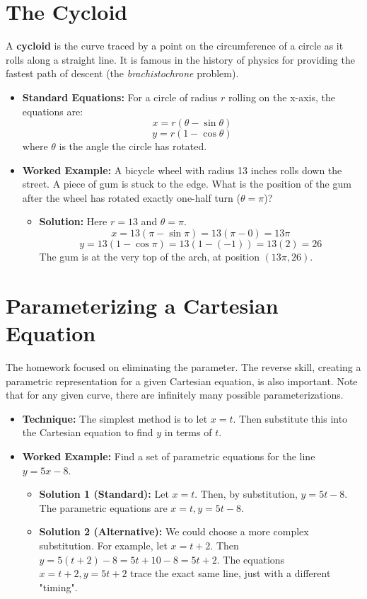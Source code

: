 \documentclass{article}
\begin{document}
\section{The Cycloid}

A \textbf{cycloid} is the curve traced by a point on the circumference of a circle as it rolls along a straight line. It is famous in the history of physics for providing the fastest path of descent (the \textit{brachistochrone} problem).
\begin{itemize}
    \item \textbf{Standard Equations:} For a circle of radius $r$ rolling on the x-axis, the equations are:
    \[ x = r(\theta - \sin \theta) \]
    \[ y = r(1 - \cos \theta) \]
    where $\theta$ is the angle the circle has rotated.

    \item \textbf{Worked Example:} A bicycle wheel with radius 13 inches rolls down the street. A piece of gum is stuck to the edge. What is the position of the gum after the wheel has rotated exactly one-half turn ($\theta = \pi$)?
        \begin{itemize}
            \item \textbf{Solution:} Here $r=13$ and $\theta = \pi$.
            \[ x = 13(\pi - \sin \pi) = 13(\pi - 0) = 13\pi \]
            \[ y = 13(1 - \cos \pi) = 13(1 - (-1)) = 13(2) = 26 \]
            The gum is at the very top of the arch, at position $(13\pi, 26)$.
        \end{itemize}
\end{itemize}

\section{Parameterizing a Cartesian Equation}

The homework focused on eliminating the parameter. The reverse skill, creating a parametric representation for a given Cartesian equation, is also important. Note that for any given curve, there are infinitely many possible parameterizations.
\begin{itemize}
    \item \textbf{Technique:} The simplest method is to let $x=t$. Then substitute this into the Cartesian equation to find $y$ in terms of $t$.

    \item \textbf{Worked Example:} Find a set of parametric equations for the line $y = 5x - 8$.
        \begin{itemize}
            \item \textbf{Solution 1 (Standard):} Let $x=t$. Then, by substitution, $y = 5t - 8$.
            The parametric equations are $x=t, y=5t-8$.

            \item \textbf{Solution 2 (Alternative):} We could choose a more complex substitution. For example, let $x = t+2$. Then $y = 5(t+2) - 8 = 5t + 10 - 8 = 5t+2$.
            The equations $x=t+2, y=5t+2$ trace the exact same line, just with a different "timing".
        \end{itemize}
\end{itemize}
\end{document}
